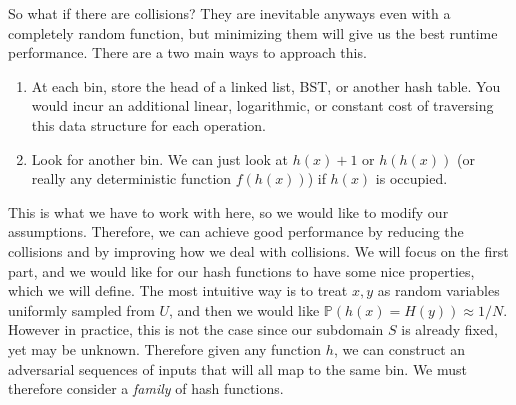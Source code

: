\documentclass{article}
\begin{document}
    So what if there are collisions? They are inevitable anyways even with a completely random function, but minimizing them will give us the best runtime performance. There are a two main ways to approach this. 
    \begin{enumerate}
      \item At each bin, store the head of a linked list, BST, or another hash table. You would incur an additional linear, logarithmic, or constant cost of traversing this data structure for each operation.  
      \item Look for another bin. We can just look at $h(x) + 1$ or $h(h(x))$ (or really any deterministic function $f(h(x))$) if $h(x)$ is occupied. 
    \end{enumerate}

    This is what we have to work with here, so we would like to modify our assumptions. Therefore, we can achieve good performance by reducing the collisions and by improving how we deal with collisions. We will focus on the first part, and we would like for our hash functions to have some nice properties, which we will define. The most intuitive way is to treat $x, y$ as random variables uniformly sampled from $U$, and then we would like $\mathbb{P}(h(x) = H(y)) \approx 1/N$. However in practice, this is not the case since our subdomain $S$ is already fixed, yet may be unknown. Therefore given any function $h$, we can construct an adversarial sequences of inputs that will all map to the same bin. We must therefore consider a \textit{family} of hash functions. 
\end{document}
